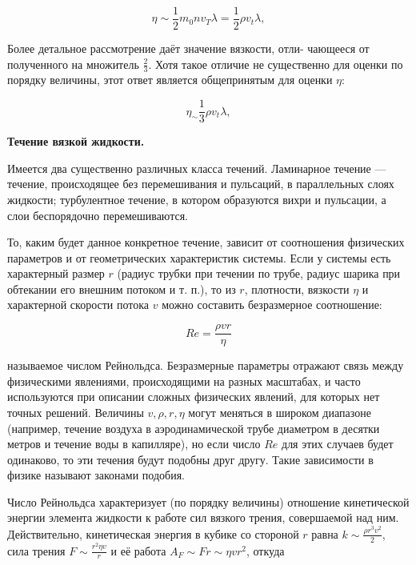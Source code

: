 \documentclass[10pt]{article}
\begin{document}
\begin{equation}
        \eta \sim \frac{1}{2} m_0 n v_T \lambda = \frac{1}{2} \rho v_t \lambda, 
\end{equation}

Более детальное рассмотрение даёт значение вязкости, отли-
чающееся от полученного на множитель $\frac{2}{3}$. Хотя такое отличие не существенно для оценки по порядку величины, этот ответ является общепринятым для оценки $\eta$:

\begin{equation}
        \eta_ \sim \frac{1}{3} \rho v_t \lambda, 
\end{equation}

\textbf{Течение вязкой жидкости.}

Имеется два существенно различных класса течений. Ламинарное течение — течение, происходящее без перемешивания и пульсаций, в параллельных слоях жидкости; турбулентное течение, в котором образуются вихри и пульсации, а слои беспорядочно перемешиваются. 

То, каким будет данное конкретное течение, зависит от соотношения физических параметров и от геометрических характеристик системы. Если у системы есть характерный размер $r$ (радиус трубки при течении по трубе, радиус шарика при обтекании его внешним потоком и т. п.), то из $r$, плотности, вязкости $\eta$ и характерной скорости потока $v$ можно составить безразмерное соотношение:

\begin{equation}
        Re = \frac{\rho v r}{\eta}
\end{equation}
 
называемое числом Рейнольдса.
Безразмерные параметры отражают связь между физическими явлениями, происходящими на разных масштабах, и часто используются при описании сложных физических явлений, для которых нет точных решений. Величины $v, \rho, r, \eta$ могут меняться в широком диапазоне (например, течение воздуха в аэродинамической трубе диаметром в десятки метров и течение воды в капилляре), но если число $Re$ для этих случаев будет одинаково, то эти течения будут подобны друг другу. Такие зависимости в физике называют законами подобия.

Число Рейнольдса характеризует (по порядку величины) отношение кинетической энергии элемента жидкости к работе сил вязкого трения, совершаемой над ним. Действительно, кинетическая энергия в кубике со стороной $r$ равна
$ k \sim \frac{\rho r^3 v^2}{2}$, сила трения $F \sim \frac{r^2 \eta v}{r}$ и её работа $ A_F \sim F r \sim \eta v r^2 $, откуда
\end{document}
